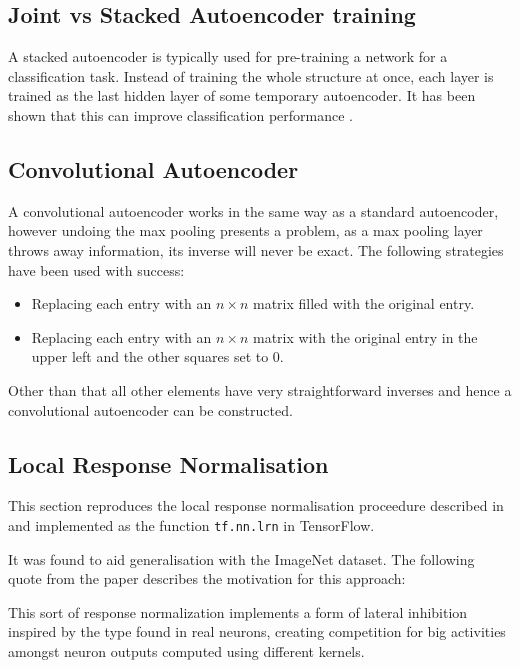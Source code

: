   \subsection{Joint vs Stacked Autoencoder training}
    A stacked autoencoder is typically used for pre-training a network for a classification task.
    Instead of training the whole structure at once, each layer is trained as the last hidden
    layer of some temporary autoencoder. It has been shown that this can improve classification performance \cite{stacks}.
  \subsection{Convolutional Autoencoder}
    A convolutional autoencoder works in the same way as a standard autoencoder, however
    undoing the max pooling presents a problem, as a max pooling layer throws away
    information, its inverse will never be exact. The following strategies have been
    used with success:
    \begin{itemize}
      \item Replacing each entry with an $n \times n$ matrix filled with the original
      entry.
      \item Replacing each entry with an  $n\times n$  matrix with
      the original entry in the upper left and the other squares set to 0. \cite{Dosovitskiy2015}
    \end{itemize}

    Other than that all other elements have very straightforward inverses and hence
    a convolutional autoencoder can be constructed.
  \subsection{Local Response Normalisation} \label{sec:lrn}
    This section reproduces the local response normalisation proceedure described in \cite{Krizhevsky2012}
    and implemented as the function \texttt{tf.nn.lrn} in TensorFlow.

    It was found to aid generalisation with the ImageNet dataset. The following quote from the paper \cite{Krizhevsky2012}
    describes the motivation for this approach:

    \begin{displayquote}
      This sort of response normalization implements a form of lateral inhibition
      inspired by the type found in real neurons, creating competition for big activities amongst neuron
      outputs computed using different kernels.
    \end{displayquote}

